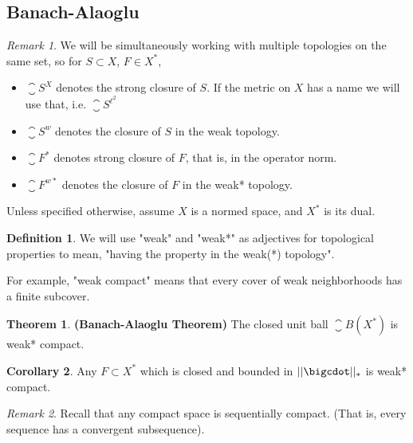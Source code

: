 \documentclass[a5paper]{article}
\theoremstyle{definition}%
\newtheorem{theorem}{Theorem}
\newtheorem{corollary}[theorem]{Corollary}
\newtheorem*{definition*}{Definition}
\numberwithin{exercise}{section}
\theoremstyle{remark}%
\newtheorem*{remark*}{Remark}
\begin{document}
\subsection{Banach-Alaoglu}

\begin{remark*}
We will be simultaneously working with multiple topologies on the same set, so for $S\subset X$, $F\in X^*$,
	\begin{itemize}
	\item $\closure{S}^{X}$ denotes the strong closure of $S$. If the metric on $X$ has a name we will use that, i.e. $\closure{S}^{\ell^2}$
	\item $\closure{S}^{w}$ denotes the closure of $S$ in the weak topology. 
	\item $\closure{F}^*$ denotes strong closure of $F$, that is, in the operator norm. 
	\item $\closure{F}^{w*}$ denotes the closure of $F$ in the weak* topology.
	\end{itemize}
	
Unless specified otherwise, assume $X$ is a normed space, and $X^*$ is its dual. 
\end{remark*}

\begin{definition*}
We will use "weak" and "weak*" as adjectives for topological properties to mean, "having the property in the weak(*) topology".

For example, "weak compact" means that every cover of weak neighborhoods has a finite subcover. 
\end{definition*}

\renewcommand{\B}{\closure{B}}
\begin{highlight}
\begin{theorem}\textbf{(Banach-Alaoglu Theorem)}
The closed unit ball $\B(X^*)$ is weak* compact. 
\end{theorem}
\end{highlight}

\begin{highlight}
\begin{corollary}
Any $F\subset X^*$ which is closed and bounded in $\norm{\cdot}_*$ is weak* compact.
\end{corollary}
\end{highlight}

\begin{remark*}
Recall that any compact space is sequentially compact. (That is, every sequence has a convergent subsequence). 
\end{remark*}
\end{document}
